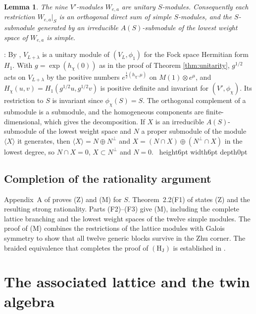 \documentclass[leqno]{article}
\newcommand{\qed}{\hfill \vrule height6pt  width6pt depth0pt}
\newcommand{\ot}{\otimes}
\newtheorem{lemma}[thm]{Lemma}
\newenvironment{proof}[1][]{\noindent {\it Proof #1} : }{\hbox{~}\qed
\smallskip
}
\numberwithin{equation}{section}
\begin{document}
\begin{lemma}
\label{lem:lattice-modules-unitary}
The nine $V'$-modules $W_{e,a}$ are unitary $S$-modules. Consequently each restriction $W_{e,a}|_S$ is an orthogonal direct sum of simple $S$-modules, and the $S$-submodule generated by an irreducible $A(S)$-submodule of the lowest weight space of $W_{e,a}$ is simple.
\end{lemma}

\begin{proof}
By \cite[Theorem 4.12]{DoL14}, $V_{L+\lambda}$ is a unitary module of $(V_L, \phi_1)$ for the Fock space Hermitian form $H_1$. With $g = \exp(h_\chi(0))$ as in the proof of Theorem \ref{thm:unitarity}, $g^{1/2}$ acts on $V_{L+\lambda}$ by the positive numbers $e^{\frac12(h_\chi,\mu)}$ on $M(1) \ot e^\mu$, and $H_\chi(u,v) = H_1(g^{1/2}u,g^{1/2}v)$ is positive definite and invariant for $(V', \phi_\chi)$. Its restriction to $S$ is invariant since $\phi_\chi(S) = S$. The orthogonal complement of a submodule is a submodule, and the homogeneous components are finite-dimensional, which gives the decomposition. If $X$ is an irreducible $A(S)$-submodule of the lowest weight space and $N$ a proper submodule of the module $\langle X\rangle$ it generates, then $\langle X\rangle = N \oplus N^\perp$ and $X = (N \cap X) \oplus (N^\perp \cap X)$ in the lowest degree, so $N \cap X = 0$, $X \subset N^\perp$ and $N = 0$.
\end{proof}

\subsection{Completion of the rationality argument}
\label{subsec:what-remains}

Appendix~A of \cite{ArhIII} proves (Z) and (M) for $S$. Theorem~2.2(F1) of \cite{ArhIII} states (Z) and the resulting strong rationality. Parts (F2)--(F3) give (M), including the complete lattice branching and the lowest weight spaces of the twelve simple modules. The proof of (M) combines the restrictions of the lattice modules with Galois symmetry to show that all twelve generic blocks survive in the Zhu corner. The braided equivalence that completes the proof of $\mathrm{(H_J)}$ is established in \cite[Theorem 6.1]{ArhIII}.

\section{The associated lattice and the twin algebra}
\label{sec:genus}
\end{document}
